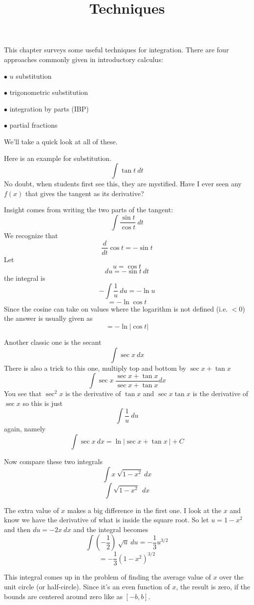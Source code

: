\documentclass[11pt, oneside]{article}
\title{Techniques}
\date{}
\begin{document}
\maketitle
\Large

\label{sec:Techniques_of_integration}

This chapter surveys some useful techniques for integration.  There are four approaches commonly given in introductory calculus:

$\bullet$ $u$ substitution

$\bullet$ trigonometric substitution

$\bullet$ integration by parts (IBP)

$\bullet$ partial fractions

We'll take a quick look at all of these.  

Here is an example for substitution.  
\[ \int \tan t \ dt \]
No doubt, when students first see this, they are mystified.  Have I ever seen any $f(x)$ that gives the tangent as its derivative?

Insight comes from writing the two parts of the tangent:
\[ \int \frac{\sin t}{\cos t} \ dt \]
We recognize that 
\[ \frac{d}{dt} \cos t = - \sin t  \]
Let
\[ u = \cos t \]
\[ du = - \sin t \ dt \]
the integral is
\[ - \int \frac{1}{u} \ du = - \ln u \]
\[ = - \ln \cos t \]
Since the cosine can take on values where the logarithm is not defined (i.e. $< 0$) the answer is usually given as
\[ = - \ln |\cos t| \]

Another classic one is the secant
\[ \int \sec x \ dx \]
There is also a trick to this one, multiply top and bottom by $\sec x + \tan x$
\[ \int \sec x \ \frac{\sec x + \tan x}{\sec x + \tan x} dx \]
You see that $\sec^2 x$ is the derivative of $\tan x$ and $\sec x \tan x$ is the derivative of $\sec x$ so this is just
\[  \int \frac{1}{u} \ du  \]
again, namely
\[ \int \sec x \ dx = \ln | \sec x +  \tan x \ | + C \]

Now compare these two integrals
\[ \int x \ \sqrt{1-x^2}  \ dx \]
\[ \int \sqrt{1-x^2} \ \ dx \]

The extra value of $x$ makes a big difference in the first one.  I look at the $x$ and know we have the derivative of what is inside the square root.  So let $u = 1-x^2$ and then $du = -2x \ dx$ and the integral becomes
\[ \int (- \frac{1}{2}) \ \sqrt{u} \ du = - \frac{1}{3} u^{3/2} \]
\[ =  - \frac{1}{3} (1-x^2)^{3/2} \]

This integral comes up in the problem of finding the average value of $x$ over the unit circle (or half-circle).  Since it's an even function of $x$, the result is zero, if the bounds are centered around zero like as $[-b,b]$.
\end{document}
